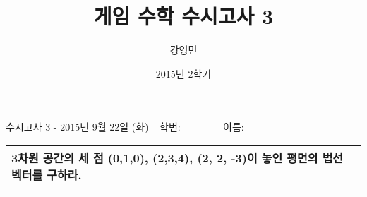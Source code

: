 \documentclass{beamer}
\title[게임수학 - 수시고사3]{ 게임 수학 수시고사 3}
\author{강영민}
\institute{동명대학교}
\date{2015년 2학기}
\begin{document}




\begin{frame}{\small 수시고사 3 - 2015년 9월 22일 (화) $~~$ 학번:$~~~~~~~~~~~~~~~~~~$                이름:  }

\begin{tabular}{|p{11cm}|} \hline
\tiny 3차원 공간의 세 점 (0,1,0), (2,3,4), (2, 2, -3)이 놓인 평면의 법선 벡터를 구하라.
\\ \hline \hline
 \\ [35ex] \hline 
\end{tabular}

\end{frame}


\end{document}
